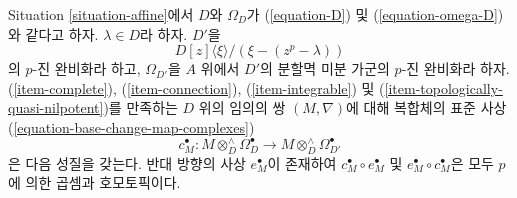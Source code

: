 \begin{lemma}
\label{lemma-computation}
Situation \ref{situation-affine}에서 $D$와 $\Omega_D$가
(\ref{equation-D}) 및 (\ref{equation-omega-D})와 같다고 하자.
$\lambda \in D$라 하자. $D'$을
$$
D[z]\langle \xi \rangle/(\xi - (z^p - \lambda))
$$
의 $p$-진 완비화라 하고, $\Omega_{D'}$을 $A$ 위에서 $D'$의
분할멱 미분 가군의 $p$-진 완비화라 하자. (\ref{item-complete}),
(\ref{item-connection}), (\ref{item-integrable}) 및
(\ref{item-topologically-quasi-nilpotent})를 만족하는 $D$ 위의 임의의
쌍 $(M, \nabla)$에 대해 복합체의 표준 사상
(\ref{equation-base-change-map-complexes})
$$
c_M^\bullet : M \otimes_D^\wedge \Omega^\bullet_D
\longrightarrow
M \otimes_D^\wedge \Omega^\bullet_{D'}
$$
은 다음 성질을 갖는다. 반대 방향의 사상 $e_M^\bullet$이 존재하여
$c_M^\bullet \circ e_M^\bullet$ 및 $e_M^\bullet \circ c_M^\bullet$은
모두 $p$에 의한 곱셈과 호모토픽이다.
\end{lemma}

